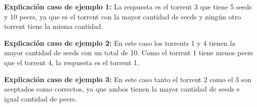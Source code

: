 \documentclass{oci}
\begin{document}
\begin{sampleDescription}
\begin{center}
    \begin{minipage}{0.95\textwidth}
    \textbf{Explicación caso de ejemplo 1:} La respuesta es el torrent 3 que tiene 5 seeds y 10 peers,
    ya que es el torrent con la mayor cantidad de seeds y ningún otro torrent tiene la misma cantidad.
    \end{minipage}
\end{center}
\begin{center}
    \begin{minipage}{0.95\textwidth}
    \textbf{Explicación caso de ejemplo 2:} En este caso los torrents 1 y 4 tienen la mayor cantidad
    de seeds con un total de 10.
    Como el torrent 1 tiene menos peers que el torrent 4, la respuesta es el torrent 1.
    \end{minipage}
\end{center}
\begin{center}
    \begin{minipage}{0.95\textwidth}
    \textbf{Explicación caso de ejemplo 3:} En este caso tanto el torrent 2 como el 3 son aceptados
    como correctos, ya que ambos tienen la mayor cantidad de seeds e igual cantidad de peers.
    \end{minipage}
\end{center}

\end{sampleDescription}
\end{document}
